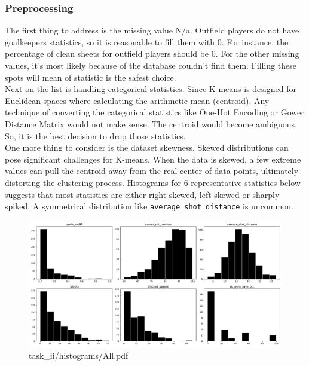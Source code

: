 \documentclass{report}
\begin{document}
\subsubsection{Preprocessing}
The first thing to address is the missing value N/a. Outfield players do not have goalkeepers statistics, 
so it is reasonable to fill them with 0. For instance, the percentage of clean sheets for outfield players 
should be 0. For the other missing values, it's most likely because of the database couldn't find them. 
Filling these spots will mean of statistic is the safest choice.\\

\noindent
Next on the list is handling categorical statistics. Since K-means is designed for Euclidean spaces where 
calculating the arithmetic mean (centroid). Any technique of converting the categorical
statistics like One-Hot Encoding or Gower Distance Matrix would not make sense. The centroid would 
become ambiguous. So, it is the best decision to drop those statistics. \\

\noindent
One more thing to consider is the dataset skewness. Skewed distributions can pose significant 
challenges for K-means. When the data is skewed, a few extreme values can pull the centroid away from 
the real center of data points, ultimately distorting the clustering process. Histograms for 6 representative 
statistics below suggests that most statistics are either right skewed, left skewed or sharply-spiked. 
A symmetrical distribution like \verb|average_shot_distance| is uncommon.
\begin{figure}[ht!]
    \centering
    \includegraphics[width=\textwidth]{../output/task_ii/histograms/All.pdf}
    \caption{task\_ii/histograms/All.pdf}
\end{figure}
\end{document}
